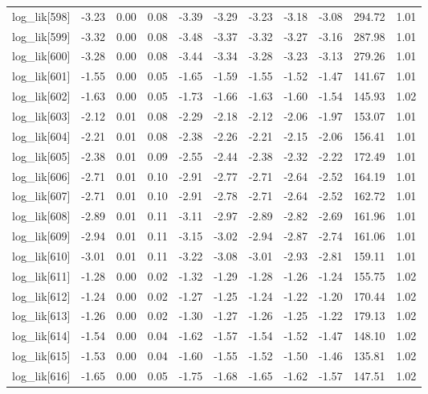 \begin{table}[ht]
\begin{tabular}{rrrrrrrrrrr}
  log\_lik[598] & -3.23 & 0.00 & 0.08 & -3.39 & -3.29 & -3.23 & -3.18 & -3.08 & 294.72 & 1.01 \\ 
  log\_lik[599] & -3.32 & 0.00 & 0.08 & -3.48 & -3.37 & -3.32 & -3.27 & -3.16 & 287.98 & 1.01 \\ 
  log\_lik[600] & -3.28 & 0.00 & 0.08 & -3.44 & -3.34 & -3.28 & -3.23 & -3.13 & 279.26 & 1.01 \\ 
  log\_lik[601] & -1.55 & 0.00 & 0.05 & -1.65 & -1.59 & -1.55 & -1.52 & -1.47 & 141.67 & 1.01 \\ 
  log\_lik[602] & -1.63 & 0.00 & 0.05 & -1.73 & -1.66 & -1.63 & -1.60 & -1.54 & 145.93 & 1.02 \\ 
  log\_lik[603] & -2.12 & 0.01 & 0.08 & -2.29 & -2.18 & -2.12 & -2.06 & -1.97 & 153.07 & 1.01 \\ 
  log\_lik[604] & -2.21 & 0.01 & 0.08 & -2.38 & -2.26 & -2.21 & -2.15 & -2.06 & 156.41 & 1.01 \\ 
  log\_lik[605] & -2.38 & 0.01 & 0.09 & -2.55 & -2.44 & -2.38 & -2.32 & -2.22 & 172.49 & 1.01 \\ 
  log\_lik[606] & -2.71 & 0.01 & 0.10 & -2.91 & -2.77 & -2.71 & -2.64 & -2.52 & 164.19 & 1.01 \\ 
  log\_lik[607] & -2.71 & 0.01 & 0.10 & -2.91 & -2.78 & -2.71 & -2.64 & -2.52 & 162.72 & 1.01 \\ 
  log\_lik[608] & -2.89 & 0.01 & 0.11 & -3.11 & -2.97 & -2.89 & -2.82 & -2.69 & 161.96 & 1.01 \\ 
  log\_lik[609] & -2.94 & 0.01 & 0.11 & -3.15 & -3.02 & -2.94 & -2.87 & -2.74 & 161.06 & 1.01 \\ 
  log\_lik[610] & -3.01 & 0.01 & 0.11 & -3.22 & -3.08 & -3.01 & -2.93 & -2.81 & 159.11 & 1.01 \\ 
  log\_lik[611] & -1.28 & 0.00 & 0.02 & -1.32 & -1.29 & -1.28 & -1.26 & -1.24 & 155.75 & 1.02 \\ 
  log\_lik[612] & -1.24 & 0.00 & 0.02 & -1.27 & -1.25 & -1.24 & -1.22 & -1.20 & 170.44 & 1.02 \\ 
  log\_lik[613] & -1.26 & 0.00 & 0.02 & -1.30 & -1.27 & -1.26 & -1.25 & -1.22 & 179.13 & 1.02 \\ 
  log\_lik[614] & -1.54 & 0.00 & 0.04 & -1.62 & -1.57 & -1.54 & -1.52 & -1.47 & 148.10 & 1.02 \\ 
  log\_lik[615] & -1.53 & 0.00 & 0.04 & -1.60 & -1.55 & -1.52 & -1.50 & -1.46 & 135.81 & 1.02 \\ 
  log\_lik[616] & -1.65 & 0.00 & 0.05 & -1.75 & -1.68 & -1.65 & -1.62 & -1.57 & 147.51 & 1.02 \\ 

\end{tabular}
\end{table}
